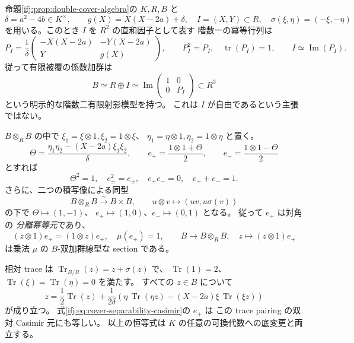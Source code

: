 \begin{proposition}
\label{ifj:prop:cover-trace-casimir}
命題\ref{ifj:prop:double-cover-algebra}の $K,R,B$ と
\[
 \delta=a^2-4b\in K^\times,\qquad
 g(X)=X(X-2a)+\delta,\quad
 I=(X,Y)\subset R,\quad
 \sigma(\xi,\eta)=(-\xi,-\eta)
\]
を用いる。このとき $I$ を $R^2$ の直和因子として表す
階数一の冪等行列は
\begin{equation}\label{ifj:eq:cover-picard-idempotent}
 P_I=\frac1\delta
 \begin{pmatrix}
 -X(X-2a)&-Y(X-2a)\\
 Y&g(X)
 \end{pmatrix},
 \qquad P_I^2=P_I,\quad
 \operatorname{tr}(P_I)=1,\qquad
 I\simeq\operatorname{Im}(P_I).
\end{equation}
従って有限被覆の係数加群は
\[
 B\simeq R\oplus I
 \simeq\operatorname{Im}
 \begin{pmatrix}1&0\\0&P_I\end{pmatrix}
 \subset R^3
\]
という明示的な階数二有限射影模型を持つ。
これは $I$ が自由であるという主張ではない。

$B\otimes_RB$ の中で
$\xi_1=\xi\otimes1,\xi_2=1\otimes\xi$、
$\eta_1=\eta\otimes1,\eta_2=1\otimes\eta$ と置く。
\begin{equation}\label{ifj:eq:cover-separability-casimir}
 \Theta=\frac{\eta_1\eta_2-(X-2a)\xi_1\xi_2}{\delta},
 \qquad
 e_+=\frac{1\otimes1+\Theta}{2},\qquad
 e_-=\frac{1\otimes1-\Theta}{2}
\end{equation}
とすれば
\[
 \Theta^2=1,\quad
 e_\pm^2=e_\pm,\quad e_+e_-=0,\quad e_++e_-=1.
\]
さらに、二つの積写像による同型
\[
 B\otimes_RB\xrightarrow{\sim}B\times B,\qquad
 u\otimes v\longmapsto(uv,u\sigma(v))
\]
の下で $\Theta\mapsto(1,-1)$、
$e_+\mapsto(1,0)$、$e_-\mapsto(0,1)$ となる。
従って $e_+$ は対角の
\emph{分離冪等元}であり、
\begin{equation}\label{ifj:eq:cover-diagonal-splitting}
 (z\otimes1)e_+=(1\otimes z)e_+,\quad
 \mu(e_+)=1,\qquad
 B\longrightarrow B\otimes_RB,\quad
 z\longmapsto(z\otimes1)e_+
\end{equation}
は乗法 $\mu$ の $B$-双加群線型な section である。

相対 trace は $\operatorname{Tr}_{B/R}(z)=z+\sigma(z)$ で、
$\operatorname{Tr}(1)=2$、$\operatorname{Tr}(\xi)
=\operatorname{Tr}(\eta)=0$ を満たす。
すべての $z\in B$ について
\begin{equation}\label{ifj:eq:cover-trace-dual-frame}
 z=\frac12\operatorname{Tr}(z)
   +\frac1{2\delta}\left(
      \eta\,\operatorname{Tr}(\eta z)
       -(X-2a)\xi\,\operatorname{Tr}(\xi z)
     \right)
\end{equation}
が成り立つ。
式\eqref{ifj:eq:cover-separability-casimir}の $e_+$ は
この trace pairing の双対 Casimir 元にも等しい。
以上の恒等式は $K$ の任意の可換代数への底変更と両立する。
\end{proposition}

